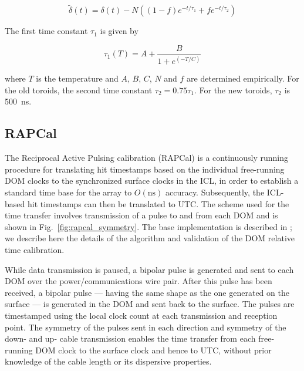 \begin{equation}
\tilde{\delta}(t) = \delta (t) - N((1 - f) e^{-t/\tau_1} +f
e^{-t/\tau_2})
\end{equation}

\noindent The first time constant $\tau_1$ is given by 

\begin{equation}
\tau_1(T) = A + \frac{B}{1 + e^{(-T/C)}}
\end{equation}

\noindent where $T$ is the temperature and $A$, $B$, $C$, $N$ and $f$ are determined empirically.
For the old toroids, the second time constant $\tau_2 =0.75\tau_1$. For the
new toroids, $\tau_2$ is 500~ns.

\subsection{\label{sect:dom:rapcal}RAPCal}

The Reciprocal Active Pulsing calibration (RAPCal) is a
continuously running procedure for translating hit timestamps based on the 
individual free-running DOM clocks to the synchronized surface clocks in the
ICL, in order to establish a standard time base for the array to
$O(\mathrm{ns})$ accuracy.  Subsequently, the ICL-based hit timestamps can
then be translated to UTC.  The scheme used for the time transfer involves
transmission of a pulse to and from each DOM and is shown in
Fig.~\ref{fig:rapcal_symmetry}.  The base implementation is described in
\cite{ICECUBE:DAQ}; we describe here the details of the 
algorithm and validation of the DOM relative time calibration. 

While data transmission is paused, a bipolar pulse is generated and sent to
each DOM over the power/communications wire pair.  After 
this pulse has been received, a bipolar pulse --- having the same shape
as the one generated on the surface --- is generated in the DOM and sent
back to the surface.  The pulses are timestamped using the local
clock count at each transmission and reception point.  The symmetry of the
pulses sent in each direction and symmetry of the down- and up- cable
transmission enables the time transfer from each free-running DOM clock to the
surface clock and hence to UTC, without prior knowledge of the cable length
or its dispersive properties.

